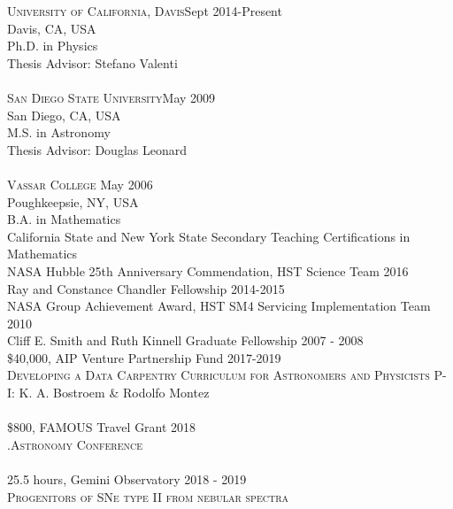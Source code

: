 \documentclass[10pt]{cv}
\begin{document}
\begin{llist}
\vspace{0.1in} 
\textsc{University of California, Davis}\hfill Sept 2014-Present\\
Davis, CA, USA \\
Ph.D. in Physics \\
Thesis Advisor: Stefano Valenti \\
\\
\textsc{San Diego State University}\hfill May 2009\\
San Diego, CA, USA \\
M.S. in Astronomy \\
Thesis Advisor: Douglas Leonard \\
\\
\textsc{Vassar College} \hfill May 2006 \\
Poughkeepsie, NY, USA \\
B.A. in Mathematics \\
California State and New York State Secondary Teaching Certifications in Mathematics \\
\vspace{-0.1in}   
NASA Hubble 25th Anniversary Commendation, HST Science Team \hfill 2016 \\ %
Ray and Constance Chandler Fellowship \hfill 2014-2015 \\
NASA Group Achievement Award, HST SM4 Servicing Implementation Team \hfill2010 \\
Cliff E. Smith and Ruth Kinnell Graduate Fellowship \hfill 2007 - 2008\\
\vspace{-0.1in}   
\$40,000, AIP Venture Partnership Fund \hfill 2017-2019\\
\textsc{Developing a Data Carpentry Curriculum for Astronomers and Physicists}
P-I: K. A. Bostroem \& Rodolfo Montez\\
\\
\$800, FAMOUS Travel Grant \hfill2018\\ 
\textsc{.Astronomy Conference}\\
\\
25.5 hours, Gemini Observatory \hfill 2018 - 2019\\
\textsc{Progenitors of SNe type II from nebular spectra}\\

\end{llist}
\end{document}
